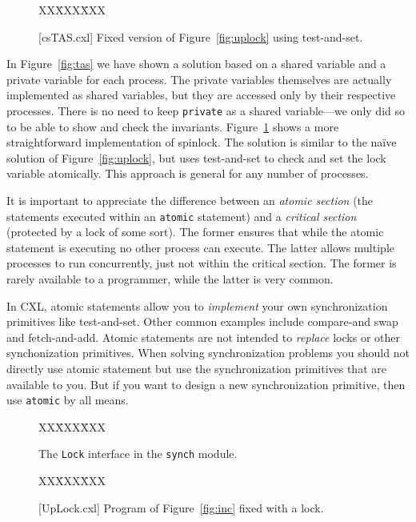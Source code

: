 \documentclass{report}
\newcommand{\cxlsource}[1]{
\begin{tabbing}
XX\=XXX\=XXX\kill
    
\end{tabbing}
}
\newenvironment{code}{
\tcolorbox
}{
\endtcolorbox
}
\begin{document}
\begin{figure}
\begin{code}
\cxlsource{csTAS}
\end{code}
\caption{[csTAS.cxl] Fixed version of Figure~\ref{fig:uplock} using test-and-set.}
\label{fig:tas2}
\end{figure}

In Figure~\ref{fig:tas} we have shown a solution based on a shared
variable and a private variable for each process.   The private
variables themselves are actually implemented as shared variables,
but they are accessed only by their respective processes.
There is no need to keep \texttt{private} as a shared
variable---we only did so to be able to show and check the invariants.
Figure~\ref{fig:tas2} shows a more straightforward implementation of spinlock.
The solution is similar to the na\"{i}ve solution of Figure~\ref{fig:uplock},
but uses test-and-set to check and set the lock variable atomically.
This approach is general for any number of processes.

It is important to appreciate the difference between an
\emph{atomic section} (the statements executed within an
\texttt{atomic} statement) and a \emph{critical section}
(protected by a lock of some sort).
The former ensures that while the
atomic statement is executing no other process can execute.
The latter allows multiple processes to run concurrently,
just not within the critical section.
The former is rarely available to a programmer, while the latter
is very common.

In CXL, atomic statements allow you to \emph{implement} your own
synchronization primitives like test-and-set.  Other common examples
include compare-and swap and fetch-and-add.  Atomic statements
are not intended to \emph{replace} locks or other synchonization primitives.
When solving synchronization problems you should not directly use
atomic statement but use the synchronization primitives that are available
to you.  But if you want to design a new synchronization primitive, then
use \texttt{atomic} by all means.

\begin{figure}
\begin{code}
\cxlsource{lockintf}
\end{code}
\caption{The \texttt{Lock} interface in the \texttt{synch} module.}
\label{fig:spinlocks}
\end{figure}

\begin{figure}
\begin{code}
\cxlsource{UpLock}
\end{code}
\caption{[UpLock.cxl] Program of Figure~\ref{fig:inc} fixed with a lock.}
\label{fig:incfixed}
\end{figure}
\end{document}
